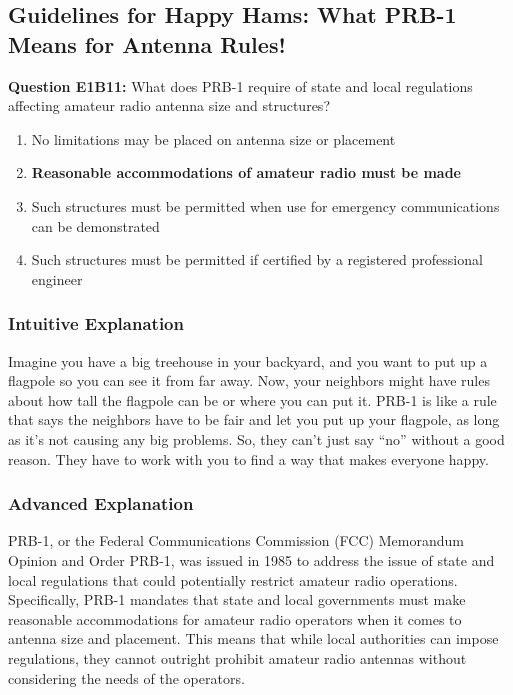 \subsection{Guidelines for Happy Hams: What PRB-1 Means for Antenna Rules!}
\label{sec:E1B11}

\begin{tcolorbox}[colback=gray!10!white,colframe=black!75!black]
    \textbf{Question E1B11:} What does PRB-1 require of state and local regulations affecting amateur radio antenna size and structures?
    
    \begin{enumerate}[label=\Alph*)]
        \item No limitations may be placed on antenna size or placement
        \item \textbf{Reasonable accommodations of amateur radio must be made}
        \item Such structures must be permitted when use for emergency communications can be demonstrated
        \item Such structures must be permitted if certified by a registered professional engineer
    \end{enumerate}
\end{tcolorbox}

\subsubsection{Intuitive Explanation}
Imagine you have a big treehouse in your backyard, and you want to put up a flagpole so you can see it from far away. Now, your neighbors might have rules about how tall the flagpole can be or where you can put it. PRB-1 is like a rule that says the neighbors have to be fair and let you put up your flagpole, as long as it’s not causing any big problems. So, they can’t just say “no” without a good reason. They have to work with you to find a way that makes everyone happy.

\subsubsection{Advanced Explanation}
PRB-1, or the Federal Communications Commission (FCC) Memorandum Opinion and Order PRB-1, was issued in 1985 to address the issue of state and local regulations that could potentially restrict amateur radio operations. Specifically, PRB-1 mandates that state and local governments must make reasonable accommodations for amateur radio operators when it comes to antenna size and placement. This means that while local authorities can impose regulations, they cannot outright prohibit amateur radio antennas without considering the needs of the operators.

